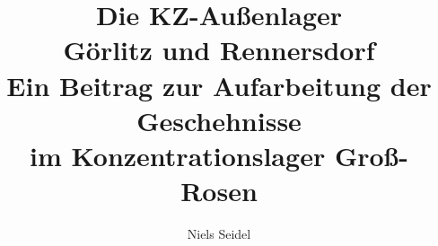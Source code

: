 \documentclass[a4paper,12pt,ngerman,
]{nisebook}
\begin{document}

\newpage ~\newpage



\newpage
\normalsize

\begin{titlepage}
	\title{Die KZ-Außenlager\\ Görlitz und Rennersdorf\vspace{10 pt}
	\\\large{Ein Beitrag zur Aufarbeitung der Geschehnisse\\ im Konzentrationslager Groß-Rosen}}
	\author{Niels Seidel}
  \maketitle
\end{titlepage}
\end{document}
